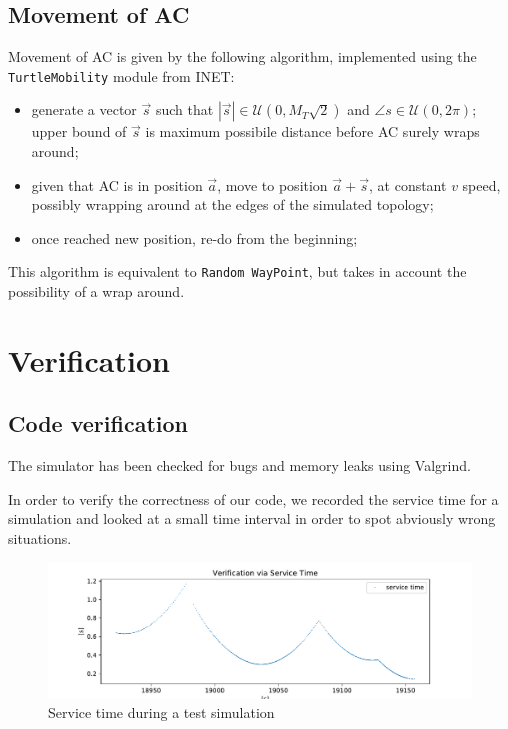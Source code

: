 \documentclass[a4paper,12pt]{article}
\begin{document}
\subsection{Movement of AC}
Movement of AC is given by the following algorithm, implemented using the \texttt{TurtleMobility} module from INET:
\begin{itemize}
  \item generate a vector $\vec{s}$ such that $|\vec{s}| \in \mathcal{U}(0, M_{T}\sqrt{2})$ and $\angle{s} \in \mathcal{U}(0, 2\pi)$; upper bound of $\vec{s}$ is maximum possibile distance before AC surely wraps around;
  \item given that AC is in position $\vec{a}$, move to position $\vec{a} + \vec{s}$, at constant $v$ speed, possibly wrapping around at the edges of the simulated topology;
  \item once reached new position, re-do from the beginning;
\end{itemize}

This algorithm is equivalent to \texttt{Random WayPoint}, but takes in account the possibility of a wrap around.

\section{Verification}
\subsection{Code verification}
The simulator has been checked for bugs and memory leaks using Valgrind.

In order to verify the correctness of our code, we recorded the service time for a simulation and looked at a small time interval in order to spot abviously wrong situations.

\begin{figure}[H]
  \centering
  \includegraphics[scale=0.6]{img/verification-via-service-time.pdf}
  \caption{Service time during a test simulation}
  \label{fig:verification-via-service-time}
\end{figure}
\end{document}
